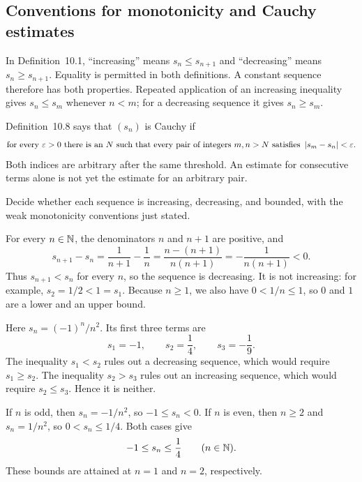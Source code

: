\subsection*{Conventions for monotonicity and Cauchy estimates}
In Definition~10.1, ``increasing'' means $s_n\le s_{n+1}$ and
``decreasing'' means $s_n\ge s_{n+1}$. Equality is permitted in both
definitions. A constant sequence therefore has both properties.
Repeated application of an increasing inequality gives $s_n\le s_m$
whenever $n<m$; for a decreasing sequence it gives $s_n\ge s_m$.

Definition~10.8 says that $(s_n)$ is Cauchy if
\[
 \text{for every }\varepsilon>0\text{ there is an }N\text{ such that
 every pair of integers }m,n>N\text{ satisfies }
 \left|s_m-s_n\right|<\varepsilon.
\]
Both indices are arbitrary after the same threshold. An estimate for
consecutive terms alone is not yet the estimate for an arbitrary pair.


\goal Decide whether each sequence is increasing, decreasing, and
bounded, with the weak monotonicity conventions just stated.

For every $n\in\mathbb{N}$, the denominators $n$ and $n+1$ are positive, and
\[
 s_{n+1}-s_n
   =\frac1{n+1}-\frac1n
   =\frac{n-(n+1)}{n(n+1)}
   =-\frac1{n(n+1)}<0.
\]
Thus $s_{n+1}<s_n$ for every $n$, so the sequence is decreasing.
It is not increasing: for example, $s_2=1/2<1=s_1$.
Because $n\ge1$, we also have $0<1/n\le1$, so $0$ and $1$ are
a lower and an upper bound.


Here $s_n=(-1)^n/n^2$. Its first three terms are
\[
 s_1=-1,\qquad s_2=\frac14,\qquad s_3=-\frac19.
\]
The inequality $s_1<s_2$ rules out a decreasing sequence, which would
require $s_1\ge s_2$. The inequality $s_2>s_3$ rules out an increasing
sequence, which would require $s_2\le s_3$. Hence it is neither.

If $n$ is odd, then $s_n=-1/n^2$, so $-1\le s_n<0$.
If $n$ is even, then $n\ge2$ and $s_n=1/n^2$, so
$0<s_n\le1/4$. Both cases give
\[
 -1\le s_n\le\frac14\qquad(n\in\mathbb{N}).
\]
These bounds are attained at $n=1$ and $n=2$, respectively.


